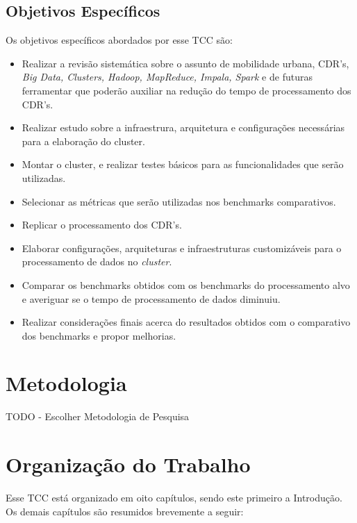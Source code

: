         \subsection{Objetivos Específicos}

            Os objetivos específicos abordados por esse TCC são:

            \begin{itemize}
                \item Realizar a revisão sistemática sobre o assunto de mobilidade urbana, CDR's, \textit{Big Data, Clusters, Hadoop,
                          MapReduce, Impala, Spark} e de futuras ferramentar que poderão auxiliar na redução do tempo de
                          processamento dos CDR's.
                \item Realizar estudo sobre a infraestrura, arquitetura e configurações necessárias para a elaboração do cluster.
                \item Montar o cluster, e realizar testes básicos para as funcionalidades que serão utilizadas.
                \item Selecionar as métricas que serão utilizadas nos benchmarks comparativos.
                \item Replicar o processamento dos CDR's.
                \item Elaborar configurações, arquiteturas e infraestruturas customizáveis para o processamento de dados no \textit{cluster}.
                \item Comparar os benchmarks obtidos com os benchmarks do processamento alvo e averiguar se o tempo
                          de processamento de dados diminuiu.
                \item Realizar considerações finais acerca do resultados obtidos com o comparativo dos benchmarks e propor melhorias.
            \end{itemize}


\section{Metodologia}

    TODO - Escolher Metodologia de Pesquisa

\section{Organização do Trabalho}

    Esse TCC está organizado em oito capítulos, sendo este primeiro a Introdução. Os
    demais capítulos são resumidos brevemente a seguir:

